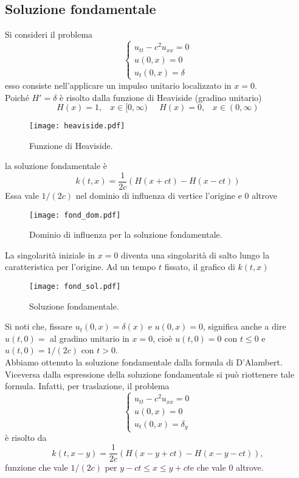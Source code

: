 \subsection{Soluzione fondamentale}
Si consideri il problema
\[
	\left\{
	\begin{array}{l}
		u_{tt}-c^2u_{xx}=0\\
		u(0,x)=0\\
		u_t(0,x)=\delta
	\end{array}
	\right.
\]
esso consiste nell'applicare un impulso unitario localizzato in $x=0$. \\
Poich\'e $H'=\delta$ \`e risolto dalla funzione di Heaviside (gradino unitario)
\[
	H(x)=1, \;\;\; x \in [0, \infty) \;\;\;\;\;
	H(x)=0, \;\;\; x \in (0,\infty)
\]
\begin{figure}[H]
	\centering
	\texttt{[image: heaviside.pdf]}
	\caption{Funzione di Heaviside.}
	\label{heaviside2}
\end{figure}
\noindent
la soluzione fondamentale \`e
\[
	k(t,x)= \frac{1}{2c}(H(x+ct)- H(x-ct))
\]
Essa vale $1/(2c)$ nel dominio di influenza di vertice l'origine e $0$ altrove
\begin{figure}[H]
	\centering
	\texttt{[image: fond\_dom.pdf]}
	\caption{Dominio di influenza per la soluzione fondamentale.}
	\label{fond_dom}
\end{figure}
\noindent
La singolarit\`a iniziale in  $x=0$ diventa una singolarit\`a di salto lungo la
caratteristica per l'origine.
Ad un tempo $t$ fissato, il grafico di $k(t,x)$
\begin{figure}[H]
	\centering
	\texttt{[image: fond\_sol.pdf]}
	\caption{Soluzione fondamentale.}
	\label{fond_sol}
\end{figure}
\noindent
Si noti che, fissare $u_t(0,x)=\delta(x)$ e $u(0,x)=0$,
significa anche a dire $u(t,0)= $ al gradino unitario in $x=0$, cio\`e
$u(t,0)=0$ con $t\leq 0$ e $u(t,0)=1/(2c)$ con $t>0$.\\
Abbiamo ottenuto la soluzione fondamentale dalla formula di D'Alambert.
Viceversa dalla espressione della soluzione fondamentale si pu\`o riottenere
tale formula.
Infatti, per traslazione, il problema
\[
	\left\{
	\begin{array}{l}
		u_{tt}-c^2u_{xx}=0\\
		u(0,x)=0\\
		u_t(0,x)=\delta_y
	\end{array}
	\right.
\]
\`e risolto da
\[
	k(t,x-y)= \frac{1}{2c}(H(x-y+ct)- H(x-y-ct)),
\]
funzione che vale $1/(2c)$ per $y-ct\leq x \leq y+ct$e che vale $0$ altrove.
